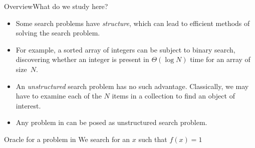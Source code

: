 
\begin{frame}{Overview}{What do we study here?}

\begin{itemize}
    \item Some search problems have \emph{structure}, which can lead to efficient methods of solving the search problem.
    \item For example, a sorted array of integers can be subject to binary search, discovering whether an integer is present in $\Theta(\log{N})$ time for an array of size~$N$.
    \item An \emph{unstructured} search problem has no such advantage.  Classically, we may have to examine each of the $N$ items in a collection to find an object of interest.
    \item Any problem in \href{https://complexityzoo.net/Complexity_Zoo:N\#np}{} can be posed as unstructured search problem.
\end{itemize}
    
\end{frame}

\begin{frame}{Oracle for a problem in \href{https://complexityzoo.net/Complexity_Zoo:N\#np}{}}{We search for an $x$ such that $f(x)=1$}

    
\end{frame}

